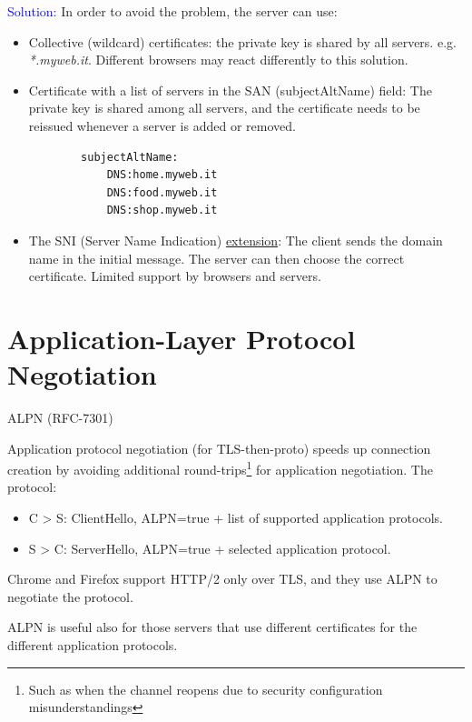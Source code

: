 \noindent \textcolor{Blue}{Solution: } In order to avoid the problem, the server can use:
\begin{itemize}
    \item Collective (wildcard) certificates: the private key is shared by all servers. e.g. \textit{*.myweb.it}.
    Different browsers may react differently to this solution.

    \item Certificate with a list of servers in the SAN (subjectAltName) field: The private key is shared among all servers, and the certificate needs to be reissued whenever a server is added or removed.
    \begin{verbatim}
        subjectAltName:
            DNS:home.myweb.it
            DNS:food.myweb.it
            DNS:shop.myweb.it
    \end{verbatim}
    \item The SNI (Server Name Indication) \underline{extension}: The client sends the domain name in the initial message. The server can then choose the correct certificate.
    Limited support by browsers and servers.
    
\end{itemize}


\section{Application-Layer Protocol Negotiation}
\begin{center}
    ALPN (RFC-7301)
\end{center}

Application protocol negotiation (for TLS-then-proto) speeds up connection creation by avoiding additional round-trips\footnote{Such as when the channel reopens due to security configuration misunderstandings} for application negotiation.
The protocol:
\begin{itemize}
    \item C > S: ClientHello, ALPN=true + list of supported application protocols.
    \item S > C: ServerHello, ALPN=true + selected application protocol.
\end{itemize}
\begin{tcolorbox}[colback=blue!10!white, colframe=blue!50!white]
Chrome and Firefox support HTTP/2 only over TLS, and they use ALPN to negotiate the protocol.
\end{tcolorbox}

ALPN is useful also for those servers that use different certificates for the different application protocols.
